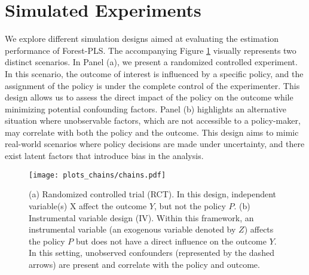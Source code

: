 \documentclass[12pt]{article}
\begin{document}
\section{Simulated Experiments}
We explore different simulation designs aimed at evaluating the estimation performance of Forest-PLS. The accompanying Figure \ref{fig_chains} visually represents two distinct scenarios. In Panel (a), we present a randomized controlled experiment. In this scenario, the outcome of interest is influenced by a specific policy, and the assignment of the policy is under the complete control of the experimenter. This design allows us to assess the direct impact of the policy on the outcome while minimizing potential confounding factors. Panel (b) highlights an alternative situation where unobservable factors, which are not accessible to a policy-maker, may correlate with both the policy and the outcome.  This design aims to mimic real-world scenarios where policy decisions are made under uncertainty, and there exist latent factors that introduce bias in the analysis.


\begin{figure}[H]
	\centering
	\texttt{[image: plots\_chains/chains.pdf]}
	\caption{(a) Randomized controlled trial (RCT). In this design, independent variable(s) X affect the outcome $Y$, but not the policy $P$. (b) Instrumental variable design (IV). Within this framework, an instrumental variable (an exogenous variable denoted by $Z$) affects the policy $P$ but does not have a direct influence on the outcome $Y$. In this setting, unobserved confounders (represented by the dashed arrows) are present and correlate with the policy and outcome. }\label{fig_chains}
\end{figure}
\end{document}
